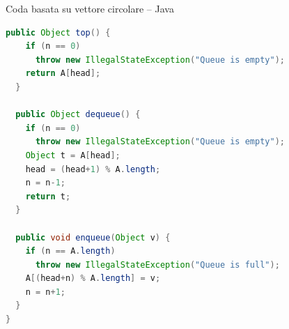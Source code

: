 \begin{frame}[fragile,shrink=5]{Coda basata su vettore circolare -- Java}

\vspace{-12pt}
  \begin{lstlisting}[language=Java]
  public Object top() { 
    if (n == 0) 
      throw new IllegalStateException("Queue is empty");
    return A[head]; 
  }

  public Object dequeue() {
    if (n == 0) 
      throw new IllegalStateException("Queue is empty");
    Object t = A[head];
    head = (head+1) % A.length;
    n = n-1;
    return t;
  }

  public void enqueue(Object v) {
    if (n == A.length) 
      throw new IllegalStateException("Queue is full");
    A[(head+n) % A.length] = v;
    n = n+1;
  }
} 
\end{lstlisting}

\end{frame}




